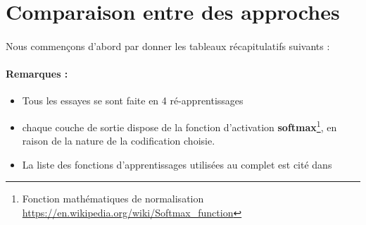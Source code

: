 \section{Comparaison entre des approches}
\paragraph{}Nous commençons d'abord par donner les tableaux récapitulatifs suivants :
\paragraph{Remarques : }
\begin{itemize}
	\item Tous les essayes se sont faite en 4 ré-apprentissages 
	\item chaque couche de sortie dispose de la fonction d'activation \textbf{softmax}\footnote{Fonction mathématiques de normalisation \url{https://en.wikipedia.org/wiki/Softmax_function}}, en raison de la nature de la codification choisie.
	\item La liste des fonctions d'apprentissages utilisées au complet est cité dans \cite{KerasOpt}
\end{itemize}
\begin{table}[H]
	\centering
	\label{zeros}
	\caption{Meilleures architectures sur les données de teste pour l'approche naïve (\ref{naiveApproache}) avec partitionnement aléatoire(\ref{randomPartLearning})}
\end{table}
